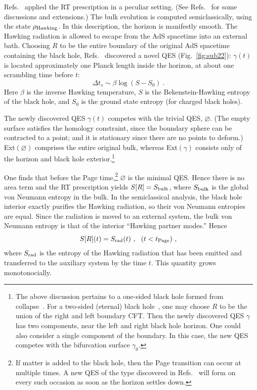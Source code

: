 \documentclass[12pt,letterpaper]{article}
\begin{document}
Refs.~\cite{Pen19,AEMM} applied the RT prescription in a peculiar setting. (See Refs.~\cite{AMMZ,AkeEng19,AlmMah19,RozSul19,CheFis19} for some discussions and extensions.) The bulk evolution is computed semiclassically, using the state $\rho_{\rm Hawking}$. In this description, the horizon is manifestly smooth. The Hawking radiation is allowed to escape from the AdS spacetime into an external bath. Choosing $R$ to be the entire boundary of the original AdS spacetime containing the black hole, Refs.~\cite{Pen19,AEMM} discovered a novel QES (Fig.~\ref{fig:sub22}): $\gamma(t)$ is located approximately one Planck length inside the horizon, at about one scrambling time before $t$:
\begin{equation}
  \Delta t_s\sim \beta \log (S-S_0)~.
\end{equation}
Here $\beta$ is the inverse Hawking temperature, $S$ is the Bekenstein-Hawking entropy of the black hole, and $S_0$ is the ground state entropy (for charged black holes).

The newly discovered QES $\gamma(t)$ competes with the trivial QES, $\varnothing$. (The empty surface satisfies the homology constraint, since the boundary sphere can be contracted to a point; and it is stationary since there are no points to deform.) Ext$(\varnothing)$ comprises the entire original bulk, whereas Ext$(\gamma)$ consists only of the horizon and black hole exterior.\footnote{The above discussion pertains to a one-sided black hole formed from collapse~\cite{Pen19}. For a two-sided (eternal) black hole~\cite{AEMM}, one may choose $R$ to be the union of the right and left boundary CFT. Then the newly discovered QES $\gamma$ has two components, near the left and right black hole horizon. One could also consider a single component of the boundary. In this case, the new QES competes with the bifurcation surface $\gamma_0$.}

One finds that before the Page time,\footnote{If matter is added to the black hole, then the Page transition can occur at multiple times. A new QES of the type discovered in Refs.~\cite{Pen19,AEMM} will form on every such occasion as soon as the horizon settles down.} $\varnothing$ is the minimal QES. Hence there is no area term and the RT prescription yields $S[R]= S_{\rm bulk}$, where $S_{\rm bulk}$ is the global von Neumann entropy in the bulk. In the semiclassical analysis, the black hole interior exactly purifies the Hawking radiation, so their von Neumann entropies are equal. Since the radiation is moved to an external system, the bulk von Neumann entropy is that of the interior ``Hawking partner modes.'' Hence
\begin{equation}
  S[R](t) = S_{\rm rad}(t)~,~~(t<t_{\rm Page})~,
\end{equation}
where $S_{\rm rad}$ is the entropy of the Hawking radiation that has been emitted and transferred to the auxiliary system by the time $t$. This quantity grows monotonocially.
\end{document}
